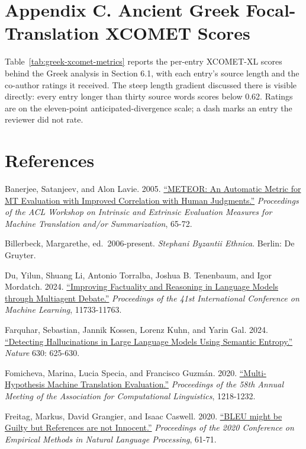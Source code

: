 \documentclass[
  12pt,
]{article}
\begin{document}
\clearpage
\section{Appendix C. Ancient Greek Focal-Translation XCOMET
Scores}\label{appendix-greek-xcomet}

Table~\ref{tab:greek-xcomet-metrics} reports the per-entry XCOMET-XL
scores behind the Greek analysis in Section 6.1, with each entry's
source length and the co-author ratings it received. The steep length
gradient discussed there is visible directly: every entry longer than
thirty source words scores below 0.62. Ratings are on the eleven-point
anticipated-divergence scale; a dash marks an entry the reviewer did not
rate.



\section{References}\label{references}

\small

Banerjee, Satanjeev, and Alon Lavie. 2005.
\href{https://aclanthology.org/W05-0909/}{``METEOR: An Automatic Metric
for MT Evaluation with Improved Correlation with Human Judgments.''}
\emph{Proceedings of the ACL Workshop on Intrinsic and Extrinsic
Evaluation Measures for Machine Translation and/or Summarization},
65-72.

Billerbeck, Margarethe, ed.~2006-present. \emph{Stephani Byzantii
Ethnica}. Berlin: De Gruyter.

Du, Yilun, Shuang Li, Antonio Torralba, Joshua B. Tenenbaum, and Igor
Mordatch. 2024.
\href{https://proceedings.mlr.press/v235/du24e.html}{``Improving
Factuality and Reasoning in Language Models through Multiagent
Debate.''} \emph{Proceedings of the 41st International Conference on
Machine Learning}, 11733-11763.

Farquhar, Sebastian, Jannik Kossen, Lorenz Kuhn, and Yarin Gal. 2024.
\href{https://doi.org/10.1038/s41586-024-07421-0}{``Detecting
Hallucinations in Large Language Models Using Semantic Entropy.''}
\emph{Nature} 630: 625-630.

Fomicheva, Marina, Lucia Specia, and Francisco Guzmán. 2020.
\href{https://doi.org/10.18653/v1/2020.acl-main.113}{``Multi-Hypothesis
Machine Translation Evaluation.''} \emph{Proceedings of the 58th Annual
Meeting of the Association for Computational Linguistics}, 1218-1232.

Freitag, Markus, David Grangier, and Isaac Caswell. 2020.
\href{https://aclanthology.org/2020.emnlp-main.5/}{``BLEU might be
Guilty but References are not Innocent.''} \emph{Proceedings of the 2020
Conference on Empirical Methods in Natural Language Processing}, 61-71.
\end{document}

